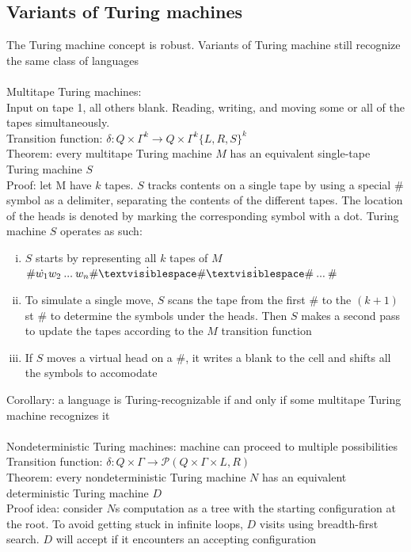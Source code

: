 \documentclass{article}
\newcommand{\tmblank}{\textvisiblespace}
\newcommand*{\<}{\langle}
\renewcommand*{\>}{\rangle}
\begin{document}
		\subsection{Variants of Turing machines}
			The Turing machine concept is robust. Variants of Turing machine still recognize the same class of languages \\
			\\
			Multitape Turing machines: \\
			Input on tape 1, all others blank. Reading, writing, and moving some or all of the tapes simultaneously. \\
			Transition function: $\delta: Q \times \Gamma^k \to Q \times \Gamma^k \{L, R, S\}^k$ \\
			Theorem: every multitape Turing machine $M$ has an equivalent single-tape Turing machine $S$ \\
			Proof: let M have $k$ tapes. $S$ tracks contents on a single tape by using a special $\#$ symbol as a delimiter, separating the contents of the different tapes. The location of the heads is denoted by marking the corresponding symbol with a dot. Turing machine $S$ operates as such:
			\begin{enumerate}[(i)]
				\item $S$ starts by representing all $k$ tapes of $M$ \\
				$\#\dot{w_1}w_2\:...\:w_n\#\dot{\tmblank}\#\dot{\tmblank}\#\:...\:\#$
				\item To simulate a single move, $S$ scans the tape from the first $\#$ to the $(k+ 1)$st $\#$ to determine the symbols under the heads. Then $S$ makes a second pass to update the tapes according to the $M$ transition function
				\item If $S$ moves a virtual head on a $\#$, it writes a blank to the cell and shifts all the symbols to accomodate
				\end{enumerate}
			Corollary: a language is Turing-recognizable if and only if some multitape Turing machine recognizes it \\
			\\
			Nondeterministic Turing machines: machine can proceed to multiple possibilities \\
			Transition function: $\delta: Q \times \Gamma \to \mathcal{P}(Q \times \Gamma \times {L, R})$ \\
			Theorem: every nondeterministic Turing machine $N$ has an equivalent deterministic Turing machine $D$ \\
			Proof idea: consider $N$s computation as a tree with the starting configuration at the root. To avoid getting stuck in infinite loops, $D$ visits using breadth-first search. $D$ will accept if it encounters an accepting configuration \\
\end{document}
